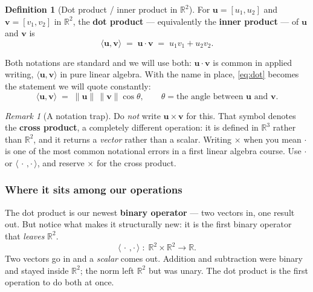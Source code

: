 \documentclass[11pt]{article}
\theoremstyle{definition}
\newtheorem{defn}{Definition}[section]
\theoremstyle{remark}
\newtheorem*{rmk}{Remark}
\newcommand{\R}{\mathbb{R}}
\newcommand{\vc}[1]{\mathbf{#1}}
\newcommand{\norm}[1]{\lVert #1\rVert}
\begin{document}
\begin{defn}[Dot product / inner product in $\R^2$]
For $\vc{u}=[u_1,u_2]$ and $\vc{v}=[v_1,v_2]$ in $\R^{2}$, the
\textbf{dot product} --- equivalently the \textbf{inner product} --- of $\vc{u}$
and $\vc{v}$ is
\[
  \langle \vc{u},\vc{v}\rangle
  \;=\; \vc{u}\cdot\vc{v}
  \;=\; u_1v_1+u_2v_2 .
\]
\end{defn}

\noindent Both notations are standard and we will use both: $\vc{u}\cdot\vc{v}$
is common in applied writing, $\langle\vc{u},\vc{v}\rangle$ in pure linear
algebra. With the name in place, \eqref{eq:dot} becomes the statement we will
quote constantly:
\[
  \langle \vc{u},\vc{v}\rangle \;=\; \norm{\vc{u}}\,\norm{\vc{v}}\cos\theta ,
  \qquad \theta = \text{the angle between } \vc{u} \text{ and } \vc{v}.
\]

\begin{rmk}[A notation trap]
Do \emph{not} write $\vc{u}\times\vc{v}$ for this. That symbol denotes the
\textbf{cross product}, a completely different operation: it is defined in
$\R^{3}$ rather than $\R^{2}$, and it returns a \emph{vector} rather than a
scalar. Writing $\times$ when you mean $\cdot$ is one of the most common
notational errors in a first linear algebra course. Use $\cdot$ or
$\langle\,\cdot\,,\cdot\,\rangle$, and reserve $\times$ for the cross product.
\end{rmk}

\subsubsection*{Where it sits among our operations}
The dot product is our newest \textbf{binary operator} --- two vectors in, one
result out. But notice what makes it structurally new: it is the first binary
operator that \emph{leaves} $\R^{2}$.
\[
  \langle\,\cdot\,,\cdot\,\rangle\;:\;\R^{2}\times\R^{2}\to\R .
\]
Two vectors go in and a \emph{scalar} comes out. Addition and subtraction were
binary and stayed inside $\R^{2}$; the norm left $\R^{2}$ but was unary. The dot
product is the first operation to do both at once.
\end{document}
